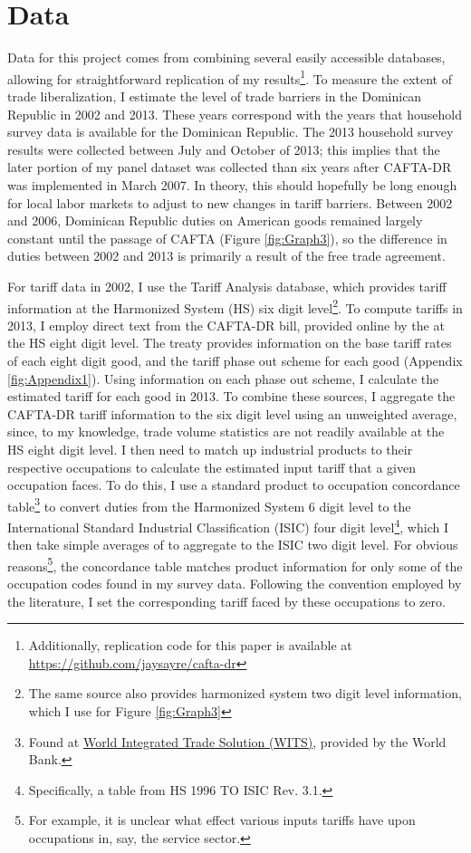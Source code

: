 \documentclass[12pt]{article}
\begin{document}
\vspace{-10pt}
\section{Data}
\label{sec:Data}
Data for this project comes from combining several easily accessible databases, allowing
for straightforward replication of my results\footnote{Additionally, replication code for this 
paper is available at \url{https://github.com/jaysayre/cafta-dr}}.
To measure the extent of trade liberalization, I estimate the level of trade barriers in the
Dominican Republic in 2002 and 2013. These years correspond with the years that household
survey data is available for the Dominican Republic. The 2013 household survey results were collected 
between July and October of 2013; this implies
that the later portion of my panel dataset was collected than six years after CAFTA-DR was implemented 
in March 2007. In theory, this should hopefully be long enough for local labor markets to adjust 
to new changes in tariff barriers.
Between 2002 and 2006, Dominican Republic duties on American goods 
remained largely constant until the passage of CAFTA (Figure \ref{fig:Graph3}), so the 
difference in duties between 2002 and 2013 is primarily a result of the free trade agreement.

For tariff data in 2002, 
I use the \citet{wtotariff} Tariff Analysis database, which provides tariff information 
at the Harmonized System (HS) six digit level\footnote{The same source
also provides harmonized system two digit level information,
which I use for Figure \ref{fig:Graph3}}. To compute tariffs in 2013, 
I employ direct text from the CAFTA-DR bill, provided online by the 
\citet{ustraderep} at the HS eight digit level. The treaty provides
information on the base tariff rates of each eight digit good, and the tariff phase out
scheme for each good (Appendix \ref{fig:Appendix1}).
Using information on each phase out scheme, I calculate the estimated tariff
for each good in 2013. To combine these sources, I aggregate
the CAFTA-DR tariff information to the six digit level using an unweighted average, 
since, to my knowledge, trade volume statistics are not readily available at the HS eight digit level.
I then need to match up industrial products to their respective occupations to calculate
the estimated input tariff that a given occupation faces. 
To do this, I use a standard product to occupation concordance table\footnote{Found at 
\href{http://wits.worldbank.org/product_concordance.html}{World Integrated Trade Solution (WITS)}, 
provided by the World Bank.} to convert duties from the Harmonized System 6 digit level to the 
International Standard Industrial Classification (ISIC) four digit 
level\footnote{Specifically, a table from HS 1996 TO ISIC Rev. 3.1.}, which I then take 
simple averages of to aggregate to the ISIC two digit level.
For obvious reasons\footnote{For example, it is unclear what effect various inputs tariffs have
upon occupations in, say, the service sector.}, the concordance table matches product information
for only some of the occupation codes found in my survey data. Following the convention employed 
by the literature, I set the corresponding tariff faced by these occupations to zero.
\end{document}
